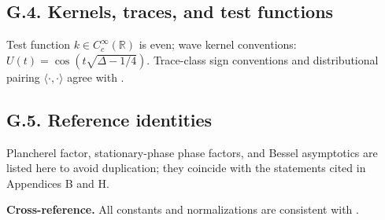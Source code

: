 \subsection*{G.4. Kernels, traces, and test functions}
\noindent
Test function $k\in C_c^\infty(\mathbb R)$ is even; wave kernel conventions:
$U(t)=\cos(t\sqrt{\Delta-1/4})$.
Trace-class sign conventions and distributional pairing $\langle \cdot,\cdot\rangle$
agree with \cite[§2]{Sogge}.

\subsection*{G.5. Reference identities}
\noindent
Plancherel factor, stationary-phase phase factors, and Bessel asymptotics are listed here
to avoid duplication; they coincide with the statements cited in Appendices B and H.

\bigskip
\noindent\textbf{Cross-reference.}
All constants and normalizations are consistent with \cite{Helgason,Iwaniec2002,Zworski,Sogge}.
